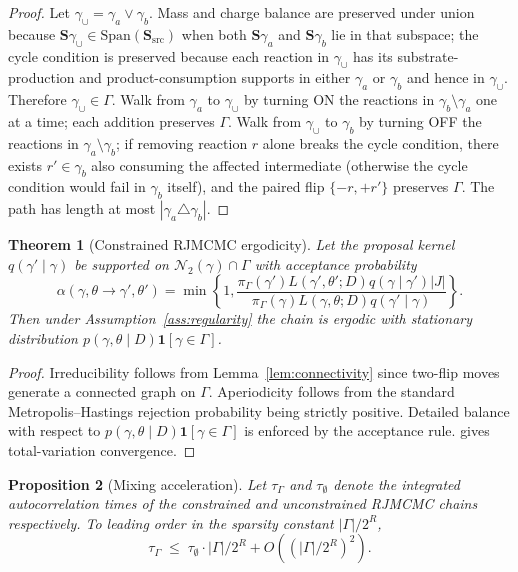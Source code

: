 \documentclass[11pt]{article}
\newtheorem{theorem}{Theorem}
\newtheorem{proposition}[theorem]{Proposition}
\theoremstyle{definition}
\theoremstyle{remark}
\begin{document}
\begin{proof}
Let $\gamma_\cup=\gamma_a\vee\gamma_b$. Mass and charge balance are preserved under union
because $\mathbf{S}\gamma_\cup\in\mathrm{Span}(\mathbf{S}_{\mathrm{src}})$ when both
$\mathbf{S}\gamma_a$ and $\mathbf{S}\gamma_b$ lie in that subspace; the cycle condition is
preserved because each reaction in $\gamma_\cup$ has its substrate-production and
product-consumption supports in either $\gamma_a$ or $\gamma_b$ and hence in $\gamma_\cup$.
Therefore $\gamma_\cup\in\Gamma$. Walk from $\gamma_a$ to $\gamma_\cup$ by turning ON the
reactions in $\gamma_b\setminus\gamma_a$ one at a time; each addition preserves $\Gamma$.
Walk from $\gamma_\cup$ to $\gamma_b$ by turning OFF the reactions in
$\gamma_a\setminus\gamma_b$; if removing reaction $r$ alone breaks the cycle condition,
there exists $r'\in\gamma_b$ also consuming the affected intermediate (otherwise the
cycle condition would fail in $\gamma_b$ itself), and the paired flip $\{-r,+r'\}$
preserves $\Gamma$. The path has length at most $|\gamma_a\triangle\gamma_b|$.
\end{proof}

\begin{theorem}[Constrained RJMCMC ergodicity]\label{thm:rjmcmc}
Let the proposal kernel $q(\gamma'\mid\gamma)$ be supported on $\mathcal N_2(\gamma)\cap\Gamma$
with acceptance probability
\[
  \alpha(\gamma,\theta\to\gamma',\theta') = \min\left\{1,\frac{\pi_\Gamma(\gamma')L(\gamma',\theta';D)q(\gamma\mid\gamma')|J|}{\pi_\Gamma(\gamma)L(\gamma,\theta;D)q(\gamma'\mid\gamma)}\right\}.
\]
Then under Assumption~\ref{ass:regularity} the chain is ergodic with stationary distribution
$p(\gamma,\theta\mid D)\mathbf{1}[\gamma\in\Gamma]$.
\end{theorem}

\begin{proof}
Irreducibility follows from Lemma~\ref{lem:connectivity} since two-flip moves generate a
connected graph on $\Gamma$. Aperiodicity follows from the standard Metropolis--Hastings
rejection probability being strictly positive. Detailed balance with respect to
$p(\gamma,\theta\mid D)\mathbf{1}[\gamma\in\Gamma]$ is enforced by the acceptance rule.
\citet[Theorem~1]{Tierney1994} gives total-variation convergence.
\end{proof}

\begin{proposition}[Mixing acceleration]\label{prop:mixing}
Let $\tau_\Gamma$ and $\tau_\emptyset$ denote the integrated autocorrelation times of the
constrained and unconstrained RJMCMC chains respectively. To leading order in the
sparsity constant $|\Gamma|/2^R$,
\[
  \tau_\Gamma \;\le\; \tau_\emptyset\cdot|\Gamma|/2^R + O((|\Gamma|/2^R)^2).
\]
\end{proposition}
\end{document}
